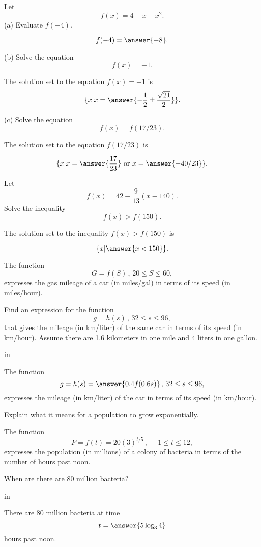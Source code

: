 \documentclass{ximera}
\newcommand{\pskip}{\vskip 0.1 in}
\begin{document}
\begin{question} \label{Qpdf0gbvgbrtg}
Let
\[
      f(x) = 4 - x - x^2 .
\]
(a) Evaluate $f(-4)$.

\[
    f(-4) = \answer{-8} .
\]

(b) Solve the equation 
\[
      f(x) = -1 .
\]

The solution set to the equation $f(x)=-1$ is
\[
  \{  x | x = \answer{-\frac{1}{2} \pm \frac{\sqrt{21}}{2}}  \}.
\]

(c) Solve the equation
\[
       f(x) = f(17/23) .
\]

The solution set to the equation $f(17/23)$ is

\[
   \{  x | x = \answer{\frac{17}{23}} \text{ or } x=\answer{-40/23}  \}.
\]

\end{question}


\begin{question}  \label{Qdfdcg4tythyh5t}
Let 
\[
       f(x) = 42 - \frac{9}{13}(x - 140) .
\]
Solve the inequality
\[
     f(x) > f(150) .
\]

The solution set to the inequality $f(x)>f(150)$ is

\[
    \{  x | \answer{x < 150}  \}.
\]

\end{question}


\begin{question}  \label{Qdfb44t4w4333}
The function 
\[
  G = f(S) \, , \, 20\leq S \leq 60 ,
\]
expresses the gas mileage of a car (in miles/gal) in terms of its speed (in miles/hour).
 
Find an expression for the function 
\[
   g = h(s) \, , \, 32\leq s \leq 96 ,
\]
that gives the mileage (in km/liter) of the same car in terms of its speed (in km/hour). Assume there are 1.6 kilometers in one mile and $4$ liters in one gallon.

\pskip

The function 
\[
    g = h(s) =   \answer{0.4f(0.6s) } \, , \, 32\leq s \leq 96 ,
\]
expresses the mileage (in km/liter) of the car in terms of its speed (in km/hour). 

\end{question}


\begin{question}  \label{Eer5htrree}
Explain what it means for a population to grow exponentially.
\end{question}

\begin{question}
The function
\[
  P = f(t) = 20 (3)^{t/5} \, , \, -1 \leq t \leq 12 ,
\]
expresses the population (in millions) of a colony of bacteria in terms of the number of hours past noon. 

When are there are 80 million bacteria?

\pskip

There are 80 million bacteria at time
\[
 t = \answer{5 \log_3 4}
\]
hours past noon.
\end{question}
\end{document}
